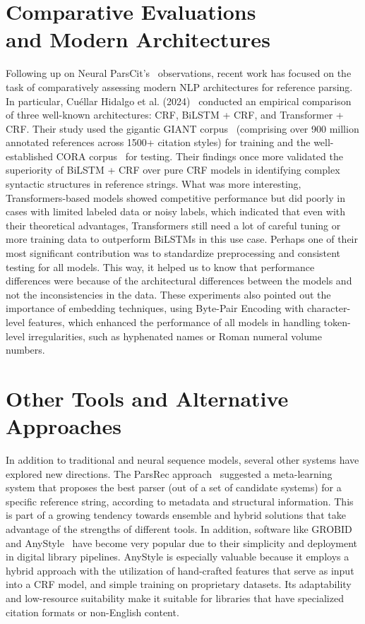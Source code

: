 \section[Comparative Evaluations and Modern Architectures]{Comparative Evaluations\\ and Modern Architectures}
Following up on Neural ParsCit’s~\cite{prasad2018neuralparscit} observations, recent work has focused on the task of comparatively assessing modern NLP architectures for reference parsing. In particular, Cuéllar Hidalgo et al. (2024)~\cite{ArchComapre} conducted an empirical comparison of three well-known architectures: CRF, BiLSTM + CRF, and Transformer + CRF. Their study used the gigantic GIANT corpus~\cite{giant} (comprising over 900 million annotated references across 1500+ citation styles) for training and the well-established CORA corpus~\cite{cora1999} for testing.
Their findings once more validated the superiority of BiLSTM + CRF over pure CRF models in identifying complex syntactic structures in reference strings. What was more interesting, Transformers-based models showed competitive performance but did poorly in cases with limited labeled data or noisy labels, which indicated that even with their theoretical advantages, Transformers still need a lot of careful tuning or more training data to outperform BiLSTMs in this use case.
Perhaps one of their most significant contribution was to standardize preprocessing and consistent testing for all models. This way, it helped us to know that performance differences were because of the architectural differences between the models and not the inconsistencies in the data. These experiments also pointed out the importance of embedding techniques, using Byte-Pair Encoding with character-level features, which enhanced the performance of all models in handling token-level irregularities, such as hyphenated names or Roman numeral volume numbers.

\section{Other Tools and Alternative Approaches}
In addition to traditional and neural sequence models, several other systems have explored new directions. The ParsRec approach~\cite{ParsRec} suggested a meta-learning system that proposes the best parser (out of a set of candidate systems) for a specific reference string, according to metadata and structural information. This is part of a growing tendency towards ensemble and hybrid solutions that take advantage of the strengths of different tools.
In addition, software like GROBID~\cite{grobid} and AnyStyle~\cite{anystyle} have become very popular due to their simplicity and deployment in digital library pipelines. AnyStyle is especially valuable because it employs a hybrid approach with the utilization of hand-crafted features that serve as input into a CRF model, and simple training on proprietary datasets. Its adaptability and low-resource suitability make it suitable for libraries that have specialized citation formats or non-English content.

